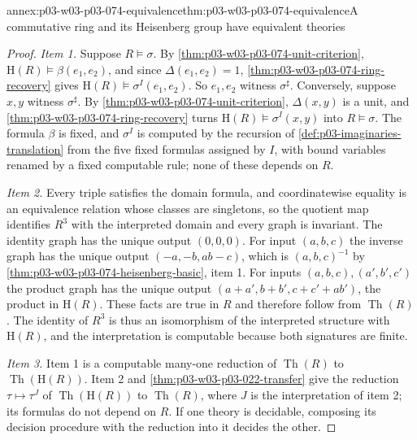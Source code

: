 \begin{annexitem}{annex:p03-w03-p03-074-equivalence}{thm:p03-w03-p03-074-equivalence}{A commutative ring and its Heisenberg group have equivalent theories}
\begin{proof}
\emph{Item 1.} Suppose \(R\models\sigma\). By
\cref{thm:p03-w03-p03-074-unit-criterion},
\(\mathrm H(R)\models\beta(e_1,e_2)\), and since \(\Delta(e_1,e_2)=1\),
\cref{thm:p03-w03-p03-074-ring-recovery} gives
\(\mathrm H(R)\models\sigma^I(e_1,e_2)\). So \(e_1,e_2\) witness
\(\sigma^{\sharp}\). Conversely, suppose \(x,y\) witness
\(\sigma^{\sharp}\). By \cref{thm:p03-w03-p03-074-unit-criterion},
\(\Delta(x,y)\) is a unit, and \cref{thm:p03-w03-p03-074-ring-recovery}
turns \(\mathrm H(R)\models\sigma^I(x,y)\) into \(R\models\sigma\).
The formula \(\beta\) is fixed, and \(\sigma^I\) is computed by the
recursion of \cref{def:p03-imaginaries-translation} from the five fixed
formulas assigned by \(I\), with bound variables renamed by a fixed
computable rule; none of these depends on \(R\).

\emph{Item 2.} Every triple satisfies the domain formula, and
coordinatewise equality is an equivalence relation whose classes are
singletons, so the quotient map identifies \(R^3\) with the interpreted
domain and every graph is invariant. The identity graph has the unique
output \((0,0,0)\). For input \((a,b,c)\) the inverse graph has the unique
output \((-a,-b,ab-c)\), which is \((a,b,c)^{-1}\) by
\cref{thm:p03-w03-p03-074-heisenberg-basic}, item 1. For inputs
\((a,b,c),(a',b',c')\) the product graph has the unique output
\((a+a',b+b',c+c'+ab')\), the product in \(\mathrm H(R)\). These facts are
true in \(R\) and therefore follow from \(\operatorname{Th}(R)\). The
identity of \(R^3\) is thus an isomorphism of the interpreted structure
with \(\mathrm H(R)\), and the interpretation is computable because both
signatures are finite.

\emph{Item 3.} Item 1 is a computable many-one reduction of
\(\operatorname{Th}(R)\) to \(\operatorname{Th}(\mathrm H(R))\). Item 2 and
\cref{thm:p03-w03-p03-022-transfer} give the reduction
\(\tau\mapsto\tau^J\) of \(\operatorname{Th}(\mathrm H(R))\) to
\(\operatorname{Th}(R)\), where \(J\) is the interpretation of item 2;
its formulas do not depend on \(R\). If one theory is decidable, composing
its decision procedure with the reduction into it decides the other.
\end{proof}
\end{annexitem}

